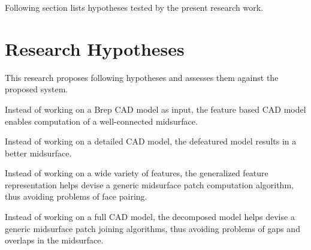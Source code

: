 
Following section lists hypotheses tested by the present research work.

\section{Research Hypotheses} \label{sec:litsurvey:rquestions}

This research proposes following hypotheses and assesses them against the proposed system.%

\begin{myhyp}
\label{hyp:features}
Instead of working on a Brep CAD model as input, the feature based CAD model enables computation of a well-connected midsurface.
\end{myhyp}

\begin{myhyp}
\label{hyp:Simplification}
Instead of working on a detailed CAD model, the defeatured model results in a better midsurface.
\end{myhyp}

\begin{myhyp}
\label{hyp:Abstraction}
Instead of working on a wide variety of features, the generalized feature representation helps devise a generic midsurface patch computation algorithm, thus avoiding problems of face pairing.
\end{myhyp}

\begin{myhyp}
\label{hyp:Decomposition}
Instead of working on a full CAD model, the decomposed model helps devise a generic midsurface patch joining algorithms, thus avoiding problems of gaps and overlaps in the midsurface.
\end{myhyp}

